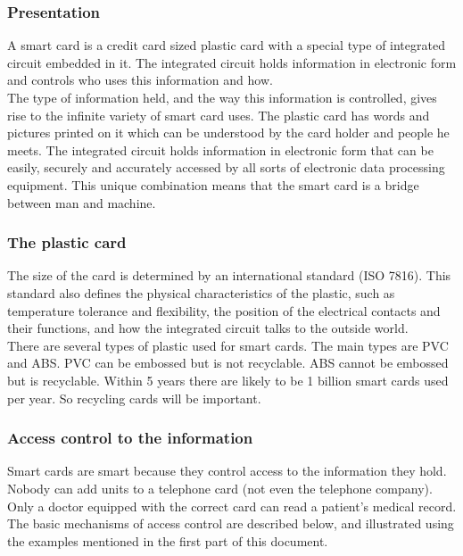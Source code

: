 \subsubsection{Presentation}
A smart card is a credit card sized plastic card with a special type of
integrated circuit embedded in it. The integrated circuit holds
information in electronic form and controls who uses this information
and how.\\

The type of information held, and the way this information is
controlled, gives rise to the infinite variety of smart card uses. The
plastic card has words and pictures printed on it which can be
understood by the card holder and people he meets. The integrated
circuit holds information in electronic form that can be easily,
securely and accurately accessed by all sorts of electronic data
processing equipment. This unique combination means that the smart card
is a bridge between man and machine.


\subsubsection{The plastic card}
The size of the card is determined by an international standard (ISO
7816). This standard also defines the physical characteristics of the
plastic, such as temperature tolerance and flexibility, the position of
the electrical contacts and their functions, and how the integrated
circuit talks to the outside world.\\

There are several types of plastic used for smart cards. The main types
are PVC and ABS. PVC can be embossed but is not recyclable. ABS cannot
be embossed but is recyclable. Within 5 years there are likely to be 1
billion smart cards used per year. So recycling cards will be important.


\subsubsection{Access control to the information}
Smart cards are smart because they control access to the information
they hold. Nobody can add units to a telephone card (not even the
telephone company). Only a doctor equipped with the correct card can
read a patient's medical record.\\

The basic mechanisms of access control are described below, and
illustrated using the examples mentioned in the first part of this
document.\\

